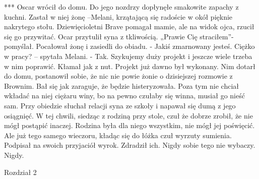 \documentclass[12pt,a4paper]{book}
\begin{document}
                                       ***
Oscar wrócił do domu. Do jego nozdrzy dopłynęłe smakowite zapachy z kuchni. Zastał w niej żonę –Melani, krzątającą się radoście w okół pięknie nakrytego stołu. Dziewięcioletni Brave pomagał mamie, ale na widok ojca, rzucił się go przywitać. Ocar przytulił syna z tkliwością. „Prawie Cię straciłem”- pomyślał. Pocałował żonę i zasiedli do obiadu. 
- Jakiś zmarnowany jesteś. Ciężko w pracy? – spytała Melani. 
- Tak. Szykujemy duży projekt i jeszcze wiele trzeba w nim poprawić.
Kłamał jak z nut. Projekt już dawno był wykonany. Nim dotarł do domu, postanowił sobie, że nic nie powie żonie o dzisiejszej rozmowie z Brownim. Bał się jak zaraguje, że będzie histeryzowała. Poza tym nie chciał wkładać na niej ciężaru winy, bo na pewno czułaby się winna, musiał go nieść sam. 
Przy obiedzie słuchał relacji syna ze szkoły i napawał się dumą z jego osiągnięć. W tej chwili, siedząc z rodziną przy stole, czuł że dobrze zrobił, że nie mógł postąpić inaczej. Rodzina była dla niego wszystkim, nie mógł jej poświęcić. 
Ale już tego samego wieczoru, kładąc się do łóżka czuł wyrzuty sumienia. Podpisał na swoich przyjaciół wyrok. Zdradził ich. Nigdy sobie tego nie wybaczy. Nigdy. 

                  Rozdział 2
\end{document}
